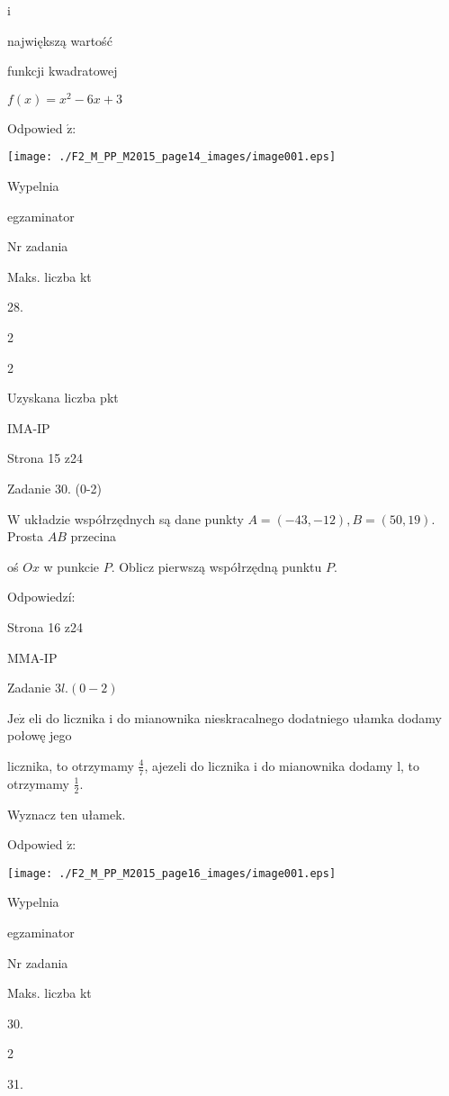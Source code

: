 \documentclass[a4paper,12pt]{article}
\begin{document}
i

największą wartość

funkcji kwadratowej

$f(x)=x^{2}-6x+3$

Odpowied $\acute{\mathrm{z}}$:
\begin{center}
\texttt{[image: ./F2\_M\_PP\_M2015\_page14\_images/image001.eps]}
\end{center}
Wypelnia

egzaminator

Nr zadania

Maks. liczba kt

28.

2

2

Uzyskana liczba pkt

IMA-IP

Strona 15 z24





Zadanie 30. (0-2)

$\mathrm{W}$ układzie współrzędnych są dane punkty $A=(-43,-12), B=(50,19)$. Prosta $AB$ przecina

oś $Ox$ w punkcie $P$. Oblicz pierwszą współrzędną punktu $P.$

Odpowiedzí:

Strona 16 z24

MMA-IP





Zadanie $3l. (0-2)$

$\mathrm{J}\mathrm{e}\dot{\mathrm{z}}$ eli do licznika i do mianownika nieskracalnego dodatniego ułamka dodamy połowę jego

licznika, to otrzymamy $\displaystyle \frac{4}{7}$, ajezeli do licznika i do mianownika dodamy l, to otrzymamy $\displaystyle \frac{1}{2}.$

Wyznacz ten ułamek.

Odpowied $\acute{\mathrm{z}}$:
\begin{center}
\texttt{[image: ./F2\_M\_PP\_M2015\_page16\_images/image001.eps]}
\end{center}
Wypelnia

egzaminator

Nr zadania

Maks. liczba kt

30.

2

31.
\end{document}
